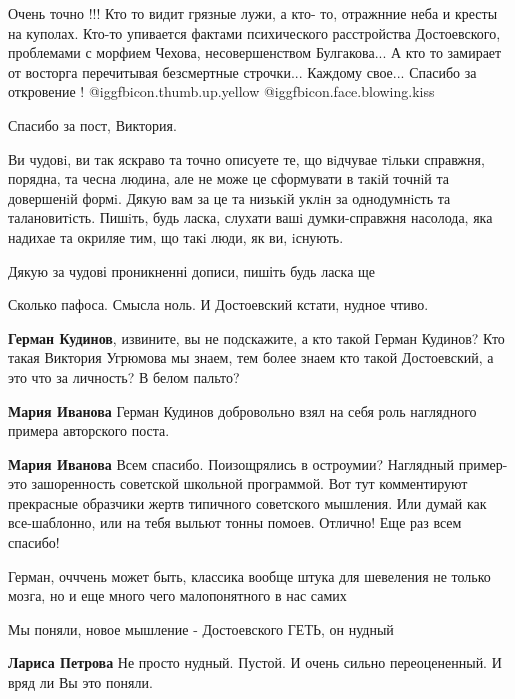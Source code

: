 \begin{itemize}

Очень точно !!! Кто то видит грязные лужи, а кто- то, отражнние неба и кресты
на куполах. Кто-то упивается фактами психического расстройства Достоевского,
проблемами с морфием Чехова, несовершенством Булгакова... А кто то замирает от
восторга перечитывая безсмертные строчки... Каждому свое... Спасибо за
откровение ! @igg{fbicon.thumb.up.yellow}  @igg{fbicon.face.blowing.kiss} 


Спасибо за пост, Виктория.


Ви чудовi, ви так яскраво та точно описуете те, що вiдчувае тiльки справжня,
порядна, та чесна людина, але не може це сформувати в такiй точнiй та
довершенiй формi. Дякую вам за це та низькiй уклiн за однодумнiсть та
талановитiсть. Пишiть, будь ласка, слухати вашi думки-справжня насолода, яка
надихае та окриляе тим, що такi люди, як ви, iснують.

Дякую за чудові проникненні дописи, пишіть будь ласка ще

Сколько пафоса. Смысла ноль. И Достоевский кстати, нудное чтиво.

\begin{itemize} %
\textbf{Герман Кудинов}, извините, вы не подскажите, а кто такой Герман Кудинов? Кто такая Виктория Угрюмова мы знаем, тем более знаем кто такой Достоевский, а это что за личность? В белом пальто?

\begin{itemize} %
\textbf{Мария Иванова} Герман Кудинов добровольно взял на себя роль наглядного примера авторского поста.

\textbf{Мария Иванова} Всем спасибо. Поизощрялись в остроумии? Наглядный пример-это зашоренность советской школьной программой. Вот тут комментируют прекрасные образчики жертв типичного советского мышления. Или думай как все-шаблонно, или на тебя выльют тонны помоев. Отлично! Еще раз всем спасибо!
\end{itemize} %

Герман, очччень может быть, классика вообще штука для шевеления не только
мозга, но и еще много чего малопонятного в нас самих

Мы поняли, новое мышление - Достоевского ГЕТЬ, он нудный

\begin{itemize} %
\textbf{Лариса Петрова} Не просто нудный. Пустой. И очень сильно переоцененный. И вряд ли Вы это поняли.
\end{itemize} %


\end{itemize}
\end{itemize}
